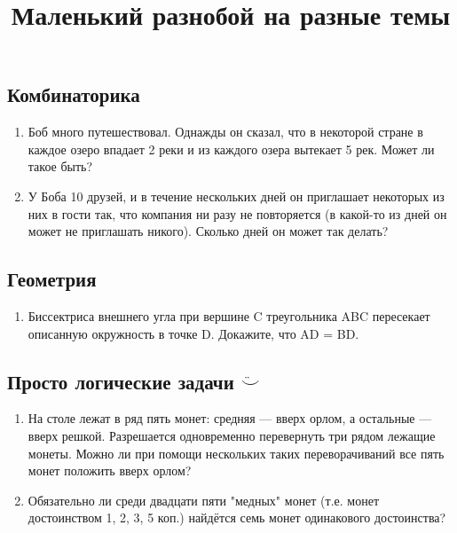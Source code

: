 \documentclass[a4paper,12pt]{article}
\title{Маленький разнобой на разные темы}
\date{}
\begin{document}
\maketitle

\subsection*{Комбинаторика}

\begin{enumerate}[label=\textbf{\arabic*.}]
    \item Боб много путешествовал. Однажды он сказал, что в некоторой стране в каждое озеро впадает 2 реки и из каждого озера вытекает 5 рек. Может ли такое быть?
    \item У Боба 10 друзей, и в течение нескольких дней он приглашает некоторых из них в гости так, что компания ни разу не повторяется (в какой-то из дней он может не приглашать никого). Сколько дней он может так делать?
\end{enumerate}

\subsection*{Геометрия}

\begin{enumerate}
    \item Биссектриса внешнего угла при вершине C треугольника ABC пересекает описанную окружность в точке D. Докажите, что AD = BD.
\end{enumerate}

\subsection*{Просто логические задачи $\ddot\smile$}

\begin{enumerate}
    \item На столе лежат в ряд пять монет: средняя  — вверх орлом, а остальные  — вверх решкой. Разрешается одновременно перевернуть три рядом лежащие монеты. Можно ли при помощи нескольких таких переворачиваний все пять монет положить вверх орлом?
    \item Обязательно ли среди двадцати пяти "медных" монет (т.е. монет достоинством 1, 2, 3, 5 коп.) найдётся семь монет одинакового достоинства?
\end{enumerate}
\end{document}
